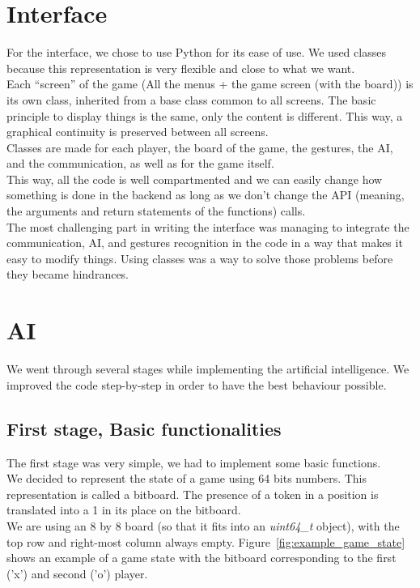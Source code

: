 \documentclass[12pt, a4paper, oneside]{report}
\begin{document}
	\section{Interface}
	For the interface, we chose to use Python for its ease of use. We used classes because this representation is very flexible and close to what we want. \\

	Each “screen” of the game (All the menus + the game screen (with the board)) is its own class, inherited from a base class common to all screens. The basic principle to display things is the same, only the content is different. This way, a graphical continuity is preserved between all screens. \\

	Classes are made for each player, the board of the game, the gestures, the AI, and the communication, as well as for the game itself. \\
	This way, all the code is well compartmented and we can easily change how something is done in the backend as long as we don't change the API (meaning, the arguments and return statements of the functions) calls. \\

	The most challenging part in writing the interface was managing to integrate the communication, AI, and gestures recognition in the code in a way that makes it easy to modify things. Using classes was a way to solve those problems before they became hindrances.

	\section{AI}\label{AI_section}

	We went through several stages while implementing the artificial intelligence. We improved the code step-by-step in order to have the best behaviour possible. \\

	\subsection{First stage, Basic functionalities}

	The first stage was very simple, we had to implement some basic functions. \\
	We decided to represent the state of a game using 64 bits numbers. This representation is called a bitboard. The presence of a token in a position is translated into a 1 in its place on the bitboard. \\
	We are using an 8 by 8 board (so that it fits into an \textit{uint64\_t} object), with the top row and right-most column always empty. Figure~\ref{fig:example_game_state} shows an example of a game state with the bitboard corresponding to the first ('x') and second ('o') player.
\end{document}
